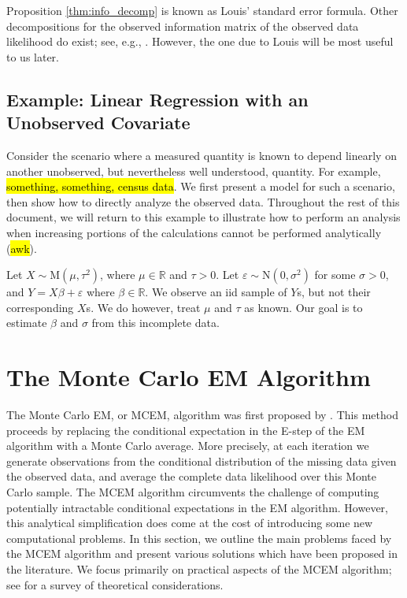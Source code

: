 \documentclass[11pt, oneside]{article}   	%
\newcommand{\bR}{\mathbb{R}}
\begin{document}
Proposition \ref{thm:info_decomp} is known as Louis' standard error formula. Other decompositions for the observed information matrix of the observed data likelihood do exist; see, e.g., \citet{Oak99,McL08}. However, the one due to Louis will be most useful to us later.

\subsection{Example: Linear Regression with an Unobserved Covariate}
\label{sec:eg-lin_reg}

Consider the scenario where a measured quantity is known to depend linearly on another unobserved, but nevertheless well understood, quantity. For example, \hl{something, something, census data}. We first present a model for such a scenario, then show how to directly analyze the observed data. Throughout the rest of this document, we will return to this example to illustrate how to perform an analysis when increasing portions of the calculations cannot be performed analytically (\hl{awk}).

Let $X \sim \mathrm{M}(\mu, \tau^2)$, where $\mu \in \bR$ and $\tau > 0$. Let $\varepsilon \sim \mathrm{N}(0, \sigma^2)$ for some $\sigma>0$, and $Y = X \beta + \varepsilon$ where $\beta \in \bR$. We observe an iid sample of $Y$s, but not their corresponding $X$s. We do however, treat $\mu$ and $\tau$ as known. Our goal is to estimate $\beta$ and $\sigma$ from this incomplete data. 


\section{The Monte Carlo EM Algorithm}

The Monte Carlo EM, or MCEM, algorithm was first proposed by \citet{Wei90}. This method proceeds by replacing the conditional expectation in the E-step of the EM algorithm with a Monte Carlo average. More precisely, at each iteration we generate observations from the conditional distribution of the missing data given the observed data, and average the complete data likelihood over this Monte Carlo sample. The MCEM algorithm circumvents the challenge of computing potentially intractable conditional expectations in the EM algorithm. However, this analytical simplification does come at the cost of introducing some new computational problems. In this section, we outline the main problems faced by the MCEM algorithm and present various solutions which have been proposed in the literature. We focus primarily on practical aspects of the MCEM algorithm; see \citet{Nea13} for a survey of theoretical considerations.
\end{document}
